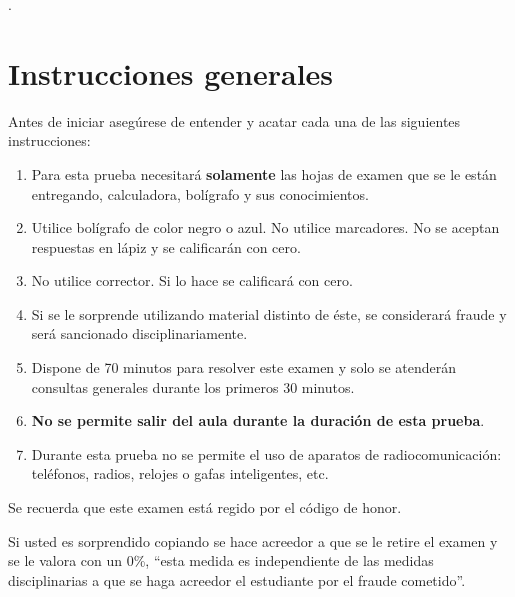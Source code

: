 {\color{white}.}\\
\AANlines
\vspace*{0.5cm}
\noindent\makebox[0.99\textwidth]{\rule{10cm}{0.4pt}}

\section*{Instrucciones generales}

Antes de iniciar asegúrese de entender y acatar cada una de las siguientes instrucciones:
\begin{enumerate}
	\item Para esta prueba necesitará \textbf{solamente} las hojas de examen que se le están entregando, calculadora, bolígrafo y sus conocimientos.
	\item Utilice bolígrafo de color negro o azul. No utilice marcadores. No se aceptan respuestas en lápiz y se calificarán con cero.
	\item No utilice corrector. Si lo hace se calificará con cero.
	\item Si se le sorprende utilizando material distinto de éste, se considerará fraude y será sancionado disciplinariamente.
	\item Dispone de 70 minutos para resolver este examen y solo se atenderán consultas generales durante los primeros 30 minutos.
	\item \textbf{No se permite salir del aula durante la duración de esta prueba}.
	\item Durante esta prueba no se permite el uso de aparatos de radiocomunicación: teléfonos, radios, relojes o gafas inteligentes, etc.
\end{enumerate}

\noindent\makebox[\textwidth]{\rule{10cm}{0.4pt}}

{
  \large
  \noindent
  Se recuerda que este examen está regido por el código de honor.

  \noindent
  Si usted es sorprendido copiando se hace acreedor a que se le retire el
  examen y se le valora con un 0\%,
  ``esta medida es independiente de las medidas disciplinarias a que se
  haga acreedor el estudiante por el fraude cometido''.
}
